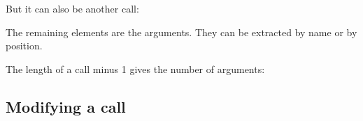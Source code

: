 \begin{Shaded}
\begin{Highlighting}[]
\StringTok{ }\NormalTok{(}\NormalTok{(}\NormalTok{, } \NormalTok{))}
\NormalTok{x[[}\NormalTok{]]}
\NormalTok{(x[[}\NormalTok{]])}
\end{Highlighting}
\end{Shaded}

But it can also be another call:

\begin{Shaded}
\begin{Highlighting}[]
\StringTok{ }\NormalTok{(}\NormalTok{(}\NormalTok{)(}\NormalTok{))}
\NormalTok{y[[}\NormalTok{]]}
\NormalTok{(y[[}\NormalTok{]])}
\end{Highlighting}
\end{Shaded}

The remaining elements are the arguments. They can be extracted by name
or by position.

\begin{Shaded}
\begin{Highlighting}[]
\StringTok{ }\NormalTok{(}\NormalTok{(}\NormalTok{, } \NormalTok{))}
\NormalTok{x[[}\NormalTok{]]}
\end{Highlighting}
\end{Shaded}

The length of a call minus 1 gives the number of arguments:

\begin{Shaded}
\begin{Highlighting}[]
\StringTok{ }
\end{Highlighting}
\end{Shaded}

\subsection{Modifying a call}

